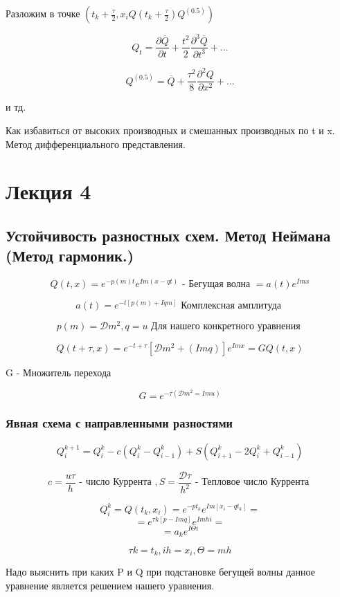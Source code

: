 \documentclass[12pt, a4paper]{article}
\begin{document}
Разложим в точке $ (t_k + \frac{\tau }{2}, x_i Q (t_k + \frac{\tau }{2}) Q^(0.5)) $

\[ Q_t = \frac{\partial \overline{Q }}{\partial t } + \frac{t^2}{2} \frac{\partial^3 \overline{Q  }}{\partial t^3 } + \dots \]

\[ Q^{(0.5)} = \overline{Q} +\frac{\tau^2}{8} \frac{\partial^2 Q}{\partial x ^2} + \dots \]

и тд.

Как избавиться от высоких производных и смешанных производных по t и x. Метод дифференциального представления.

\section{Лекция 4}

\subsection{Устойчивость разностных схем. Метод Неймана (Метод гармоник.)}

\[ Q(t, x) = e^{-p(m)t} e^{Im(x-qt)} \textrm{ - Бегущая волна } = a(t) e^{I m x}\]

\[ a(t) = e^{-t [ p(m) + I q m]} \textrm{ Комплексная амплитуда }\]

\[ p(m) = \mathcal{D} m^2, q=u \textrm{ Для нашего конкретного уравнения } \]

\[ Q(t + \tau, x) = e^{-t + \tau}[\mathcal{D}m^2 + (I m q)] e^{Imx} = G Q (t,x) \]

G - Множитель перехода

\[ G = e^{- \tau (\mathcal{D} m^2 = I m u)}  \]

\subsubsection{Явная схема с направленными разностями}

\[ Q^{k+1}_i = Q^k_i - c(Q^k_i - Q^k_{i-1}) + S (Q^k_{i+1} - 2 Q_i^k + Q^k_{i-1}) \]

\[ c = \frac{u \tau}{h} \textrm{ - число Куррента }, S = \frac{\mathcal{D } \tau }{h^2} \textrm{ - Тепловое число Куррента }\]

\[ Q^k_i = Q (t_k, x_i) = e^{-pt_k} e^{Im [x_i - q t_k]} = \]
\[ = e^{\tau k [ p - I m q]} e^{I m h i} =  \]
\[ = a_k e^{I \Theta i}\]

\[ \tau k = t_k, ih = x_i, \Theta = m h \]

Надо выяснить при каких P и Q при подстановке бегущей волны данное уравнение является решением нашего уравнения.
\end{document}
